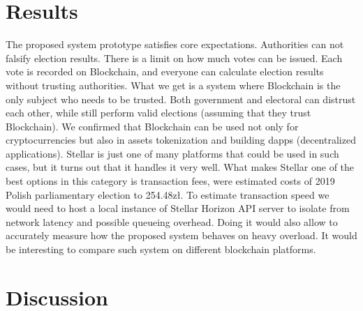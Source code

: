 \documentclass[runningheads]{llncs}
\begin{document}
\section{Results}
The proposed system prototype satisfies core expectations. Authorities can not falsify election results. There is a limit on how much votes can be issued. Each vote is recorded on Blockchain, and everyone can calculate election results without trusting authorities. What we get is a system where Blockchain is the only subject who needs to be trusted. Both government and electoral can distrust each other, while still perform valid elections (assuming that they trust Blockchain). We confirmed that Blockchain can be used not only for cryptocurrencies but also in assets tokenization and building dapps (decentralized applications). Stellar is just one of many platforms that could be used in such cases, but it turns out that it handles it very well. What makes Stellar one of the best options in this category is transaction fees, were estimated costs of 2019 Polish parliamentary election to 254.48zł. To estimate transaction speed we would need to host a local instance of Stellar Horizon API server to isolate from network latency and possible queueing overhead. Doing it would also allow to accurately measure how the proposed system behaves on heavy overload. It would be interesting to compare such system on different blockchain platforms.

\section{Discussion}



%
%
%



%
\end{document}
